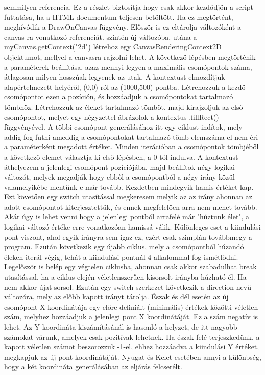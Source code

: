 semmilyen referencia. Ez a részlet biztosítja hogy csak akkor kezdődjön a script futtatása, ha a HTML documentum teljesen betöltött. Ha ez megtörtént, meghívódik a DrawOnCanvas függvény. Először is ez eltárolja változóként a canvas-ra vonatkozó referenciát.
szintén új változóba, utána a myCanvas.getContext("2d") létrehoz egy CanvasRenderingContext2D objektumot, mellyel a canvasra rajzolni lehet. A következő lépésben megtörténik a paraméterek beállítása, azaz mennyi legyen a maximális csomópontok száma, átlagosan milyen hosszúak legyenek az utak. 
A kontextust elmozdítjuk alapértelmezett helyéről, (0,0)-ról az (1000,500) pontba. Létrehozzuk a kezdő csomópontot ezen a pozíción, és hozzáadjuk a csomópontokat tartalmazó tömbhöz. Létrehozzuk az éleket tartalmazó tömböt, majd kirajzoljuk az első csomópontot, melyet egy négyzettel ábrázolok a kontextus .fillRect() függvényével. 
A többi csomópont generálásához itt egy ciklust indítok, mely addig fog futni ameddig a csomópontokat tartalmazó tömb elemszáma el nem éri a paraméterként megadott értéket. Minden iterációban a csomópontok tömbjéből a következő elemet választja ki első lépésben, a 0-tól indulva. 
A kontextust áthelyezem a jelenlegi csomópont pozíciójába, majd beállítok négy logikai változót, melyek megadják hogy ebből a csomópontból a négy irány közül valamelyikébe mentünk-e már tovább. Kezdetben mindegyik hamis értéket kap. Ezt követően egy switch utasítással megkeresem melyik az az irány ahonnan az adott 
csomópontot kiterjesztettük, és ennek megfelelően arra nem mehet tovább. Akár úgy is lehet venni hogy a jelenlegi pontból arrafelé már "húztunk élet", a logikai változó értéke erre vonatkozóan hamissá válik. Különleges eset a kiindulási pont viszont, 
ahol egyik irányra sem igaz ez, ezért csak szimplán továbbmegy a program. Ezután következik egy újabb ciklus, mely a csomópontból húzandó éleken iterál végig, tehát a kiindulási pontnál 4 alkalommal fog ismétlődni. Legelőször is belép egy végtelen ciklusba, ahonnan csak akkor szabadulhat 
break utasítással, ha a ciklus elején véletlenszerűen kisorsolt irányba húzható él. Ha nem akkor újat sorsol. Ezután egy switch szerkezet következik a direction nevű változóra, mely az előbb kapott irányt tárolja. Észak és dél esetén az új csomópont X koordinátája egy 
előre definiált (minimális) értékek közötti véletlen szám, melyhez hozzáadjuk a jelenlegi pont X koordinátáját. Ez a szám negatív is lehet. Az Y koordináta kiszámításánál is hasonló a helyzet, de itt nagyobb számokat várunk, amelyek csak pozitívak lehetnek. Ha észak felé terjeszkedünk, 
a kapott véletlen számot beszorozzuk -1-el, ehhez hozzáadva a kiindulási Y értéket, megkapjuk az új pont koordinátáját. Nyugat és Kelet esetében annyi a különbség, hogy a két koordináta generálásában az eljárás felcserélt.

